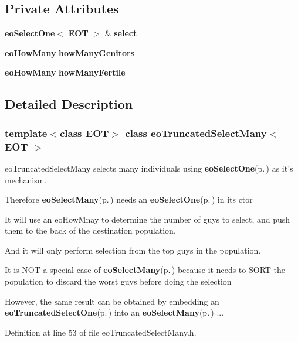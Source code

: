 \subsection*{Private Attributes}
\begin{CompactItemize}
\item 
{\bf eo\-Select\-One}$<$ {\bf EOT} $>$ \& {\bf select}\label{classeo_truncated_select_many_r0}

\item 
{\bf eo\-How\-Many} {\bf how\-Many\-Genitors}\label{classeo_truncated_select_many_r1}

\item 
{\bf eo\-How\-Many} {\bf how\-Many\-Fertile}\label{classeo_truncated_select_many_r2}

\end{CompactItemize}


\subsection{Detailed Description}
\subsubsection*{template$<$class EOT$>$ class eo\-Truncated\-Select\-Many$<$ EOT $>$}

eo\-Truncated\-Select\-Many selects many individuals using {\bf eo\-Select\-One}{\rm (p.\,\pageref{classeo_select_one})} as it's mechanism. 

Therefore {\bf eo\-Select\-Many}{\rm (p.\,\pageref{classeo_select_many})} needs an {\bf eo\-Select\-One}{\rm (p.\,\pageref{classeo_select_one})} in its ctor

It will use an eo\-How\-Mnay to determine the number of guys to select, and push them to the back of the destination population.

And it will only perform selection from the top guys in the population.

It is NOT a special case of {\bf eo\-Select\-Many}{\rm (p.\,\pageref{classeo_select_many})} because it needs to SORT the population to discard the worst guys before doing the selection

However, the same result can be obtained by embedding an {\bf eo\-Truncated\-Select\-One}{\rm (p.\,\pageref{classeo_truncated_select_one})} into an {\bf eo\-Select\-Many}{\rm (p.\,\pageref{classeo_select_many})} ... 



Definition at line 53 of file eo\-Truncated\-Select\-Many.h.

